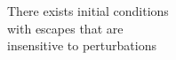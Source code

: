\documentclass[preview]{standalone}
\begin{document}
There exists initial conditions\\with escapes that are\\insensitive to perturbations\\
\end{document}
